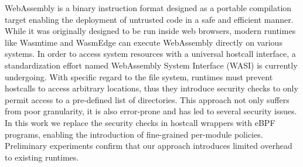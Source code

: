 WebAssembly is a binary instruction format designed as a
portable compilation target enabling the deployment of
untrusted code in a safe and efficient manner.  While it was
originally designed to be run inside web browsers, modern
runtimes like Wasmtime and WasmEdge can execute WebAssembly
directly on various systems. In order to access system
resources with a universal hostcall interface, a
standardization effort named WebAssembly System Interface
(WASI) is currently undergoing.  With specific regard to the
file system, runtimes must prevent hostcalls to access
arbitrary locations, thus they introduce security checks to
only permit access to a pre-defined list of directories.
This approach not only suffers from poor granularity, it is
also error-prone and has led to several security issues. In
this work we replace the security checks in hostcall
wrappers with eBPF programs, enabling the introduction of
fine-grained per-module policies. Preliminary experiments
confirm that our approach introduces limited overhead to
existing runtimes.
